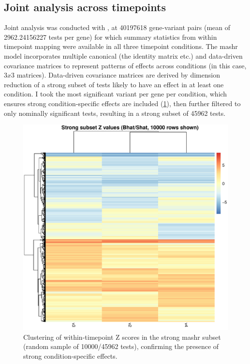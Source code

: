 \subsection{Joint  analysis across timepoints}

Joint analysis was conducted with \autocite{urbut2018FlexibleStatisticalMethods}, at 40197618 gene-variant pairs (mean of \num[round-mode=places,round-precision=0]{2962.24156227} tests per gene) for which summary statistics from within timepoint mapping were available in all three timepoint conditions.
The mashr model incorporates multiple canonical (the identity matrix etc.) and data-driven covariance matrices to represent patterns of effects across conditions (in this case, $3 x 3$ matrices).
Data-driven covariance matrices are derived by dimension reduction of a strong subset of tests likely to have an effect in at least one condition.
I took the most significant variant per gene per condition, 
which ensures strong condition-specific effects are included (\cref{fig:hird_mashr_strongSubset_Z_mega}), 
then further filtered to only nominally significant tests, resulting in a strong subset of 45962 tests.

\begin{figure}
    \centering
    \includegraphics[width=1.0\textwidth,page=1]{mainmatter/figures/chapter_03/mash_mega/mashr.strong_subset_zval_heatmap.cisDist_1e6.sampleAcThresh_15.randomSubsetN_200000.pdf}
    \caption{Clustering of within-timepoint Z scores in the strong mashr subset (random sample of 10000/45962 tests), confirming the presence of strong condition-specific effects.}
    \label{fig:hird_mashr_strongSubset_Z_mega}
\end{figure}

